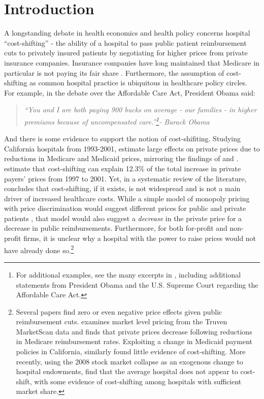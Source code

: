 \documentclass[12pt]{article}
\begin{document}
\newpage
\section{Introduction}
A longstanding debate in health economics and health policy concerns hospital ``cost-shifting'' - the ability of a hospital to pass public patient reimbursement cuts to privately insured patients by negotiating for higher prices from private insurance companies.  Insurance companies have long maintained that Medicare in particular is not paying its fair share \citep{frakt2011}.  Furthermore, the assumption of cost-shifting as common hospital practice is ubiquitous in healthcare policy circles.  For example, in the debate over the Affordable Care Act, President Obama said:
\begin{quote}
\textit{``You and I are both paying 900 bucks on average - our families - in higher premiums because of uncompensated care.''\footnote{For additional examples, see the many excerpts in \cite{dranove2017}, including additional statements from President Obama and the U.S. Supreme Court regarding the Affordable Care Act.}- Barack Obama}
\end{quote}
And there is some evidence to support the notion of cost-shifiting. Studying California hospitals from 1993-2001, \cite{zwanziger2006} estimate large effects on private prices due to reductions in Medicare and Medicaid prices, mirroring the findings of \cite{lee2003} and \cite{zwanziger2000}. \cite{zwanziger2006} estimate that cost-shifting can explain 12.3\% of the total increase in private payers' prices from 1997 to 2001.  Yet, in a systematic review of the literature, \citet{frakt2011} concludes that cost-shifting, if it exists, is not widespread and is not a main driver of increased healthcare costs.   While a simple model of monopoly pricing with price discrimination would suggest different prices for public and private patients \citep{hay1983}, that model would also suggest a \textit{decrease} in the private price for a decrease in public reimbursements.  Furthermore, for both for-profit and non-profit firms, it is unclear why a hospital with the power to raise prices would not have already done so.\footnote{Several papers find zero or even negative price effects given public reimbursement cuts. \cite{white2013} examines market level pricing from the Truven MarketScan data and finds that private prices decrease following reductions in Medicare reimbursement rates. Exploiting a change in Medicaid payment policies in California, \citet{dranove1998} similarly found little evidence of cost-shifting. More recently, using the 2008 stock market collapse as an exogenous change to hospital endowments, \cite{dranove2017} find that the average hospital does not appear to cost-shift, with some evidence of cost-shifting among hospitals with sufficient market share.}
\end{document}

